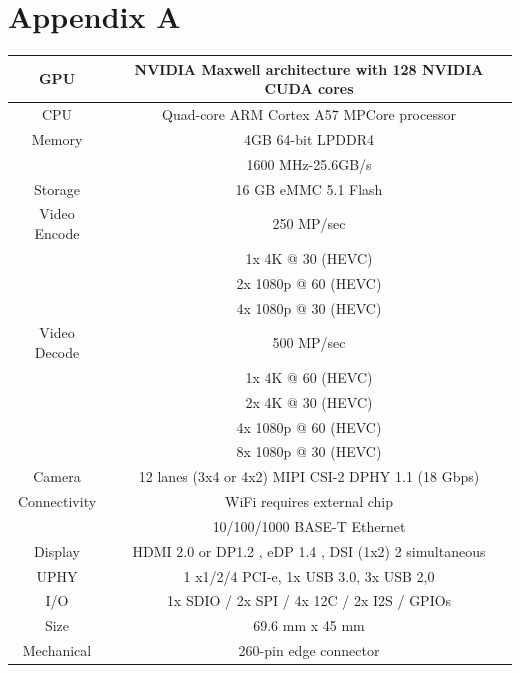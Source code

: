 \documentclass[12pt,letterpaper]{article}
\begin{document}
\section*{Appendix A}
\label{sec:appa}

\begin{tabular}{|c | c|}
    \hline
    GPU & NVIDIA Maxwell architecture with 128 NVIDIA CUDA cores \\
    \hline
    CPU & Quad-core ARM Cortex A57 MPCore processor \\
    \hline
    Memory & 4GB 64-bit LPDDR4 \\
           & 1600 MHz-25.6GB/s \\
    \hline
    Storage & 16 GB eMMC 5.1 Flash \\
    \hline
    Video Encode & 250 MP/sec \\
                 & 1x 4K @ 30 (HEVC) \\
                 & 2x 1080p @ 60 (HEVC) \\
                 & 4x 1080p @ 30 (HEVC) \\
    \hline
    Video Decode & 500 MP/sec \\
                 & 1x 4K @ 60 (HEVC) \\
                 & 2x 4K @ 30 (HEVC) \\
                 & 4x 1080p @ 60 (HEVC) \\
                 & 8x 1080p @ 30 (HEVC) \\
    \hline
    Camera & 12 lanes (3x4 or 4x2) MIPI CSI-2 DPHY 1.1 (18 Gbps) \\
    \hline
    Connectivity & WiFi requires external chip \\
                 & 10/100/1000 BASE-T Ethernet \\
    \hline
    Display & HDMI 2.0 or DP1.2 , eDP 1.4 , DSI (1x2) 2 simultaneous \\
    \hline
    UPHY & 1 x1/2/4 PCI-e, 1x USB 3.0, 3x USB 2,0 \\
    \hline
    I/O & 1x SDIO / 2x SPI / 4x 12C / 2x I2S / GPIOs \\
    \hline
    Size & 69.6 mm x 45 mm \\
    \hline
    Mechanical & 260-pin edge connector \\
    \hline
\end{tabular}

\pagebreak

\end{document}
